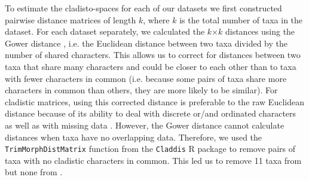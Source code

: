 \documentclass[12pt,letterpaper]{article}
\begin{document}
To estimate the cladisto-spaces for each of our datasets we first constructed pairwise distance matrices of length $k$, where $k$ is the total number of taxa in the dataset. 
For each dataset separately, we calculated the $k$$\times$$k$ distances using the Gower distance \citep{Gower71}, i.e. the Euclidean distance between two taxa divided by the number of shared characters. 
This allows us to correct for distances between two taxa that share many characters and could be closer to each other than to taxa with fewer characters in common (i.e. because some pairs of taxa share more characters in common than others, they are more likely to be similar).
For cladistic matrices, using this corrected distance is preferable to the raw Euclidean distance because of its ability to deal with discrete or/and ordinated characters as well as with missing data \citep{anderson2012using}.
However, the Gower distance cannot calculate distances when taxa have no overlapping data.
Therefore, we used the \texttt{TrimMorphDistMatrix} function from the \texttt{Claddis} R package \citep{Claddis} to remove pairs of taxa with no cladistic characters in common.
This led us to remove 11 taxa from \cite{Slater2012MEE} but none from \cite{beckancient2014}.
\end{document}
